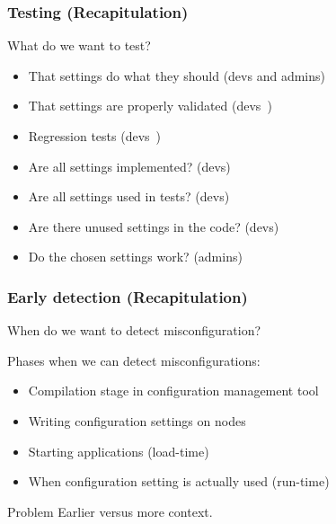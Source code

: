 \begin{frame}
	\frametitle{Testing (Recapitulation)}
	\begin{task}
	What do we want to test?
	\end{task}

	\pause

	\begin{itemize}
	\item That settings do what they should (devs and admins)
	\item That settings are properly validated (devs~\cite{xu2013blame})
	\item Regression tests (devs~\cite{qu2008configuration})
	\vspace{1em}
	\item Are all settings implemented? (devs)
	\item Are all settings used in tests? (devs)
	\item Are there unused settings in the code? (devs)
	\item Do the chosen settings work? (admins)
	\end{itemize}
\end{frame}

\begin{frame}
	\frametitle{Early detection (Recapitulation)}
	\begin{task}
	When do we want to detect misconfiguration?
	\end{task}

	\pause

	Phases when we can detect misconfigurations:
	\begin{itemize} %
	\item Compilation stage in configuration management tool
	\item Writing configuration settings on nodes
	\item Starting applications (load-time)
	\item When configuration setting is actually used (run-time)
	\end{itemize}

	\pause[\thebeamerpauses]

	\begin{alertblock}{Problem}
	Earlier versus more context.
	\end{alertblock}
\end{frame}

